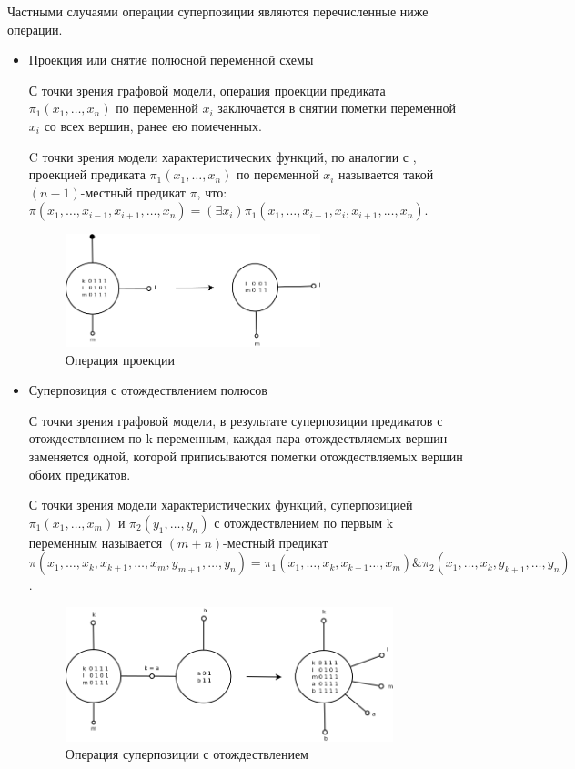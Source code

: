 \documentclass[12pt]{extarticle}
\begin{document}
Частными случаями операции суперпозиции являются перечисленные ниже операции.

\label{operations}
\begin{itemize}
    \item Проекция или снятие полюсной переменной схемы
    
    С точки зрения графовой модели, операция проекции предиката $\pi_1(x_1, \dots, x_n)$ по переменной $x_i$
    заключается в снятии пометки переменной $x_i$ со всех вершин, ранее ею помеченных.

    C точки зрения модели характеристических функций,
    по аналогии с \cite{Marchenkov}, проекцией предиката $\pi_1(x_1, \dots, x_n)$ по переменной $x_i$ называется такой
    $(n-1)$-местный предикат $\pi$, что:
    $\pi(x_1, \dots, x_{i-1}, x_{i+1}, \dots, x_n) = (\exists x_i) \pi_1(x_1, \dots, x_{i-1}, x_i, x_{i+1}, \dots, x_n)$.

    \begin{figure}[htb]
    \centering
    \includegraphics[width=0.7\textwidth]{project_op.png}
    \caption{Операция проекции}
    \label{fig:project_op}
    \end{figure}

    \samepage
    \item Суперпозиция с отождествлением полюсов

    С точки зрения графовой модели, в результате суперпозиции предикатов с отождествлением по k переменным, каждая пара
    отождествляемых вершин заменяется одной, которой приписываются пометки отождествляемых вершин обоих предикатов.

    С точки зрения модели характеристических функций, 
    суперпозицией $\pi_1(x_1, \dots, x_m)$ и $\pi_2(y_1, \dots, y_n)$ с отождествлением по первым k переменным 
    называется $(m+n)$-местный предикат
    $\pi(x_1, \dots, x_k, x_{k+1}, \dots, x_m, y_{m+1}, \dots, y_n) = \pi_1(x_1, \dots, x_k, x_{k+1} \dots, x_m) \& \pi_2(x_1, \dots, x_k, y_{k+1}, \dots, y_n)$.

    \begin{figure}[htb]
    \centering
    \includegraphics[width=0.9\textwidth]{join_op.png}
    \caption{Операция суперпозиции с отождествлением}
    \label{fig:join_op}
    \samepage
    \end{figure}


\end{itemize}
\end{document}
